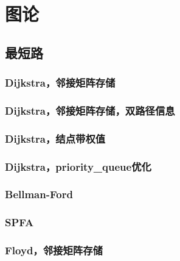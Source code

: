 
\chapter{图论}
\label{graph_theory}

\newcommand{\prefixgrapthy}[1]{graph\_theory/#1}
\newcommand{\xprefixgrapthy}[1]{graph_theory/#1}

\section{最短路}

\subsection{Dijkstra，邻接矩阵存储}



\subsection{Dijkstra，邻接矩阵存储，双路径信息}


\subsection{Dijkstra，结点带权值}


\subsection{Dijkstra，priority\_queue优化}


\subsection{Bellman-Ford}


\subsection{SPFA}


\subsection{Floyd，邻接矩阵存储}


